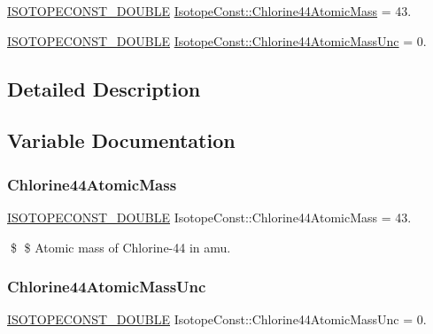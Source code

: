 \begin{DoxyCompactItemize}
\item 
\mbox{\hyperlink{group___isotope_const-_macros_ga8f45a7272ce02c0b4c65c44636ed719a}{I\+S\+O\+T\+O\+P\+E\+C\+O\+N\+S\+T\+\_\+\+D\+O\+U\+B\+LE}} \mbox{\hyperlink{group___isotope_const-_chlorine-_cl44_gab6485cd98734d7952b782770318757c3}{Isotope\+Const\+::\+Chlorine44\+Atomic\+Mass}} = 43.
\item 
\mbox{\hyperlink{group___isotope_const-_macros_ga8f45a7272ce02c0b4c65c44636ed719a}{I\+S\+O\+T\+O\+P\+E\+C\+O\+N\+S\+T\+\_\+\+D\+O\+U\+B\+LE}} \mbox{\hyperlink{group___isotope_const-_chlorine-_cl44_ga551a9b878ac2b4bffcc76e377f013011}{Isotope\+Const\+::\+Chlorine44\+Atomic\+Mass\+Unc}} = 0.
\end{DoxyCompactItemize}


\subsection{Detailed Description}


\subsection{Variable Documentation}
\mbox{\label{group___isotope_const-_chlorine-_cl44_gab6485cd98734d7952b782770318757c3}} 
\subsubsection{\texorpdfstring{Chlorine44\+Atomic\+Mass}{Chlorine44AtomicMass}}
{\footnotesize\ttfamily \mbox{\hyperlink{group___isotope_const-_macros_ga8f45a7272ce02c0b4c65c44636ed719a}{I\+S\+O\+T\+O\+P\+E\+C\+O\+N\+S\+T\+\_\+\+D\+O\+U\+B\+LE}} Isotope\+Const\+::\+Chlorine44\+Atomic\+Mass = 43.}

\$ \$ Atomic mass of Chlorine-\/44 in amu. \mbox{\label{group___isotope_const-_chlorine-_cl44_ga551a9b878ac2b4bffcc76e377f013011}} 
\subsubsection{\texorpdfstring{Chlorine44\+Atomic\+Mass\+Unc}{Chlorine44AtomicMassUnc}}
{\footnotesize\ttfamily \mbox{\hyperlink{group___isotope_const-_macros_ga8f45a7272ce02c0b4c65c44636ed719a}{I\+S\+O\+T\+O\+P\+E\+C\+O\+N\+S\+T\+\_\+\+D\+O\+U\+B\+LE}} Isotope\+Const\+::\+Chlorine44\+Atomic\+Mass\+Unc = 0.}

